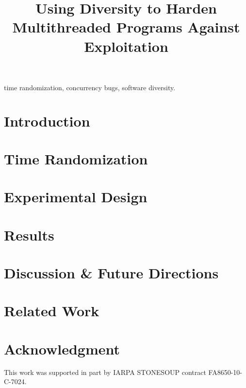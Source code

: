 \documentclass[10pt,conference,compsocconf]{IEEEtran}
\begin{document}
\title{Using Diversity to Harden Multithreaded Programs Against Exploitation}

\author{
	\and
}

\maketitle

\begin{abstract}

\end{abstract}

\begin{IEEEkeywords}
time randomization, concurrency bugs, software diversity.
\end{IEEEkeywords}

\section{Introduction}


\section{Time Randomization}\label{time-randomization}


\section{Experimental Design}\label{experiment}


\section{Results}\label{results}


\section{Discussion \& Future Directions}\label{future}


\section{Related Work}


\section{Acknowledgment}
This work was supported in part by IARPA STONESOUP contract FA8650-10-C-7024.

\balance


\end{document}
